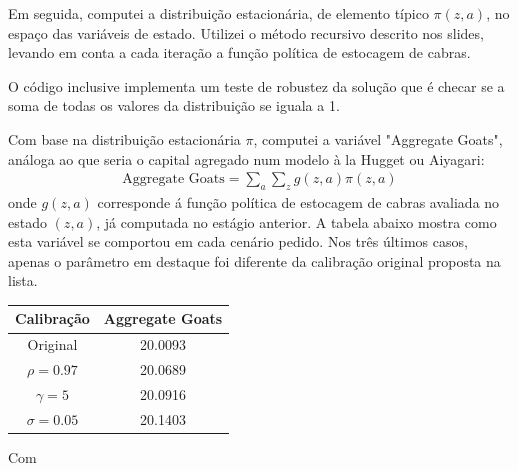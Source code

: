 \documentclass[11pt]{article}
\theoremstyle{definition}
\theoremstyle{solution}
\begin{document}
Em seguida, computei a distribuição estacionária, de elemento típico $\pi(z, a)$, no espaço das variáveis de estado. Utilizei o método recursivo descrito nos slides, levando em conta a cada iteração a função política de estocagem de cabras.

O código inclusive implementa um teste de robustez da solução que é checar se a soma de todas os valores da distribuição se iguala a 1.

Com base na distribuição estacionária $\pi$, computei a variável "Aggregate Goats", análoga ao que seria o capital agregado num modelo à la Hugget ou Aiyagari:
\begin{gather*}
	\text{Aggregate Goats} = \sum\limits_{a}\sum\limits_{z}g(z,a)\pi(z,a)
\end{gather*}
onde $g(z,a)$ corresponde á função política de estocagem de cabras avaliada no estado $(z,a)$, já computada no estágio anterior. A tabela abaixo mostra como esta variável se comportou em cada cenário pedido. Nos três últimos casos, apenas o parâmetro em destaque foi diferente da calibração original proposta na lista.
\begin{center}
	\begin{tabular}{c|c}
	Calibração & Aggregate Goats\\
	\hline
	\hline
	Original & 20.0093\\
	$\rho = 0.97$ & 20.0689\\
	$\gamma = 5$ & 20.0916\\
	$\sigma = 0.05$ & 20.1403
\end{tabular}

Com 

\end{center}
\end{document}
